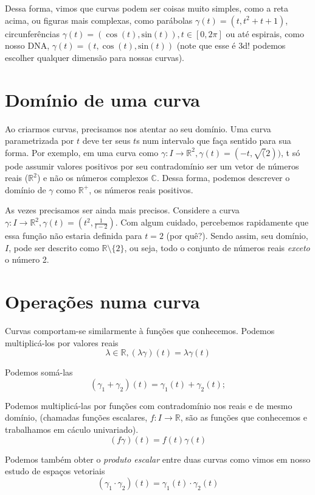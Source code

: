\documentclass[
  letterpaper,
  DIV=11,
  numbers=noendperiod]{scrreprt}
\begin{document}
Dessa forma, vimos que curvas podem ser coisas muito simples, como a
reta acima, ou figuras mais complexas, como parábolas
\(\gamma(t) = (t, t^2 + t + 1)\), circunferências
\(\gamma(t) = (\cos(t),\mathrm{sin}(t)), t \in [0, 2\pi]\) ou até
espirais, como nosso DNA, \(\gamma(t) = (t, \cos(t), \mathrm{sin}(t))\)
(note que esse é 3d! podemos escolher qualquer dimensão para nossas
curvas).

\section{Domínio de uma curva}\label{domuxednio-de-uma-curva}

Ao criarmos curvas, precisamos nos atentar ao seu domínio. Uma curva
parametrizada por \(t\) deve ter seus \(t\)s num intervalo que faça
sentido para sua forma. Por exemplo, em uma curva como
\(\gamma : I \rightarrow \mathbb{R}^2, \gamma(t) = (-t, \sqrt(2))\), t
só pode assumir valores positivos por seu contradomínio ser um vetor de
números reais (\(\mathbb{R}^2\)) e não os números complexos
\(\mathbb{C}\). Dessa forma, podemos descrever o domínio de \(\gamma\)
como \(\mathbb{R}^{+}\), os números reais positivos.

As vezes precisamos ser ainda mais precisos. Considere a curva
\(\gamma : I \rightarrow \mathbb{R}^2, \gamma(t) = \left(t^2, \frac{1}{t-2}\right)\).
Com algum cuidado, percebemos rapidamente que essa função não estaria
definida para \(t = 2\) (por quê?). Sendo assim, seu domínio, \(I\),
pode ser descrito como \(\mathbb{R} \setminus \{2\}\), ou seja, todo o
conjunto de números reais \emph{exceto} o número 2.

\section{Operações numa curva}\label{operauxe7uxf5es-numa-curva}

Curvas comportam-se similarmente à funções que conhecemos. Podemos
multiplicá-los por valores reais \[
\lambda \in \mathbb{R}, (\lambda\gamma)(t) = \lambda\gamma(t)
\]

Podemos somá-las \[
(\gamma_{1} + \gamma_{2})(t) = \gamma_{1}(t) + \gamma_{2}(t); 
\]

Podemos multiplicá-las por funções com contradomínio nos reais e de
mesmo domínio, (chamadas funções escalares,
\(f : I \rightarrow \mathbb{R}\), são as funções que conhecemos e
trabalhamos em cáculo univariado). \[
(f\gamma)(t) = f(t)\gamma(t)
\]

Podemos também obter o \emph{produto escalar} entre duas curvas como
vimos em nosso estudo de espaços vetoriais \[
(\gamma_{1} \cdot \gamma_{2})(t) = \gamma_{1}(t) \cdot \gamma_{2}(t)
\]
\end{document}
